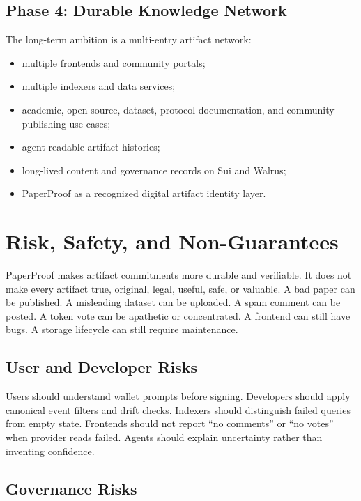 \documentclass[11pt]{article}
\begin{document}
\subsection{Phase 4: Durable Knowledge Network}

The long-term ambition is a multi-entry artifact network:

\begin{itemize}[leftmargin=*]
  \item multiple frontends and community portals;
  \item multiple indexers and data services;
  \item academic, open-source, dataset, protocol-documentation, and community publishing use cases;
  \item agent-readable artifact histories;
  \item long-lived content and governance records on Sui and Walrus;
  \item PaperProof as a recognized digital artifact identity layer.
\end{itemize}

\section{Risk, Safety, and Non-Guarantees}

PaperProof makes artifact commitments more durable and verifiable. It does not
make every artifact true, original, legal, useful, safe, or valuable. A bad paper
can be published. A misleading dataset can be uploaded. A spam comment can be
posted. A token vote can be apathetic or concentrated. A frontend can still have
bugs. A storage lifecycle can still require maintenance.

\subsection{User and Developer Risks}

Users should understand wallet prompts before signing. Developers should apply
canonical event filters and drift checks. Indexers should distinguish failed
queries from empty state. Frontends should not report ``no comments'' or ``no
votes'' when provider reads failed. Agents should explain uncertainty rather
than inventing confidence.

\subsection{Governance Risks}
\end{document}
